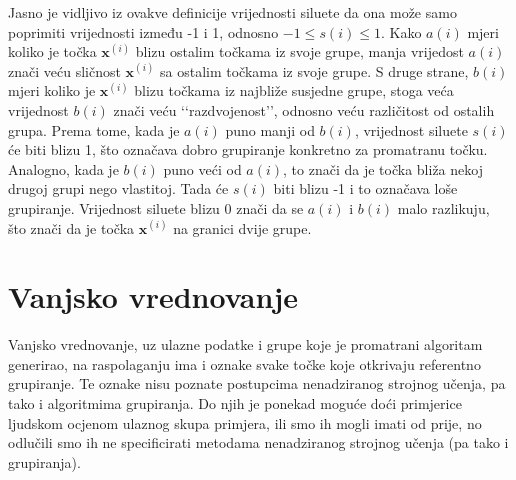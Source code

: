 \documentclass[times, utf8, zavrsni]{fer}
\begin{document}
Jasno je vidljivo iz ovakve definicije vrijednosti siluete da ona može samo poprimiti vrijednosti između -1 i 1, odnosno $-1 \leq s (i) \leq 1$. Kako $a (i)$ mjeri koliko je točka $\mathbf{x}^{(i)}$ blizu ostalim točkama iz svoje grupe, manja vrijedost $a(i)$ znači veću sličnost $\mathbf{x}^{(i)}$ sa ostalim točkama iz svoje grupe. S druge strane, $b(i)$ mjeri koliko je $\mathbf{x}^{(i)}$ blizu točkama iz najbliže susjedne grupe, stoga veća vrijednost $b (i)$ znači veću ‘‘razdvojenost’’, odnosno veću različitost od ostalih grupa. Prema tome, kada je $a(i)$ puno manji od $b(i)$, vrijednost siluete $s (i)$ će biti blizu 1, što označava dobro grupiranje konkretno za promatranu točku. Analogno, kada je $b (i)$ puno veći od $a (i)$, to znači da je točka bliža nekoj drugoj grupi nego vlastitoj. Tada će $s(i)$ biti blizu -1 i to označava loše grupiranje. Vrijednost siluete blizu 0 znači da se $a(i)$ i $b(i)$ malo razlikuju, što znači da je točka $\mathbf{x}^{(i)}$ na granici dvije grupe.

\section{Vanjsko vrednovanje}
Vanjsko vrednovanje, uz ulazne podatke i grupe koje je promatrani algoritam generirao, na raspolaganju ima i oznake svake točke koje otkrivaju referentno grupiranje. Te oznake nisu poznate postupcima nenadziranog strojnog učenja, pa tako i algoritmima grupiranja. Do njih je ponekad moguće doći primjerice ljudskom ocjenom ulaznog skupa primjera, ili smo ih mogli imati od prije, no odlučili smo ih ne specificirati metodama nenadziranog strojnog učenja (pa tako i grupiranja).
\end{document}
